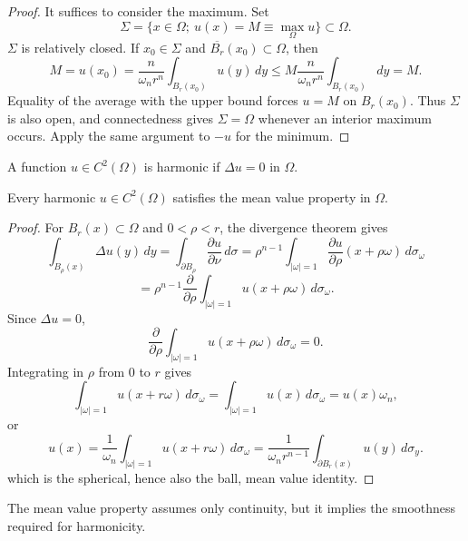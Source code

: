 \begin{proof}
\sketch It suffices to consider the maximum. Set
\[
\Sigma = \{ x \in \Omega;\ u(x) = M \equiv \max_{\Omega} u \} \subset \Omega.
\]
$\Sigma$ is relatively closed. If $x_0\in\Sigma$ and
$\overline{B_r}(x_0)\subset\Omega$, then
\[
M = u(x_0) = \frac{n}{\omega_n r^n}\int_{B_r(x_0)} u(y)\,dy \leq M \frac{n}{\omega_n r^n}\int_{B_r(x_0)} dy = M.
\]
Equality of the average with the upper bound forces $u=M$ on $B_r(x_0)$.
Thus $\Sigma$ is also open, and connectedness gives $\Sigma=\Omega$ whenever an
interior maximum occurs. Apply the same argument to $-u$ for the minimum.
\end{proof}

\begin{definition}\label{hanlin:def-harmonic}
A function $u \in C^2(\Omega)$ is harmonic if $\Delta u = 0$ in $\Omega$.
\end{definition}

\begin{theorem}\label{hanlin:thm-harmonic-mean-value}
Every harmonic $u\in C^2(\Omega)$ satisfies the mean value property in $\Omega$.
\end{theorem}

\begin{proof}
\sketch For $B_r(x)\subset\Omega$ and $0<\rho<r$, the divergence theorem gives
\[
\int_{B_\rho(x)} \Delta u(y)\,dy = \int_{\partial B_\rho}\frac{\partial u}{\partial \nu}\,d\sigma = \rho^{n-1}\int_{|\omega|=1}\frac{\partial u}{\partial \rho}(x+\rho\omega)\,d\sigma_\omega
\]
\begin{equation}
= \rho^{n-1}\frac{\partial}{\partial \rho}\int_{|\omega|=1} u(x+\rho\omega)\,d\sigma_\omega.
\end{equation}
Since $\Delta u=0$,
\[
\frac{\partial}{\partial \rho}\int_{|\omega|=1} u(x+\rho\omega)\,d\sigma_\omega = 0.
\]
Integrating in $\rho$ from $0$ to $r$ gives
\[
\int_{|\omega|=1} u(x+r\omega)\,d\sigma_\omega = \int_{|\omega|=1} u(x)\,d\sigma_\omega = u(x)\omega_n,
\]
or
\[
u(x) = \frac{1}{\omega_n}\int_{|\omega|=1} u(x+r\omega)\,d\sigma_\omega = \frac{1}{\omega_n r^{n-1}}\int_{\partial B_r(x)} u(y)\,d\sigma_y.
\]
which is the spherical, hence also the ball, mean value identity.
\end{proof}

\begin{remark}\label{hanlin:remark-mvp-not-smooth}
The mean value property assumes only continuity, but it implies the smoothness
required for harmonicity.
\end{remark}

